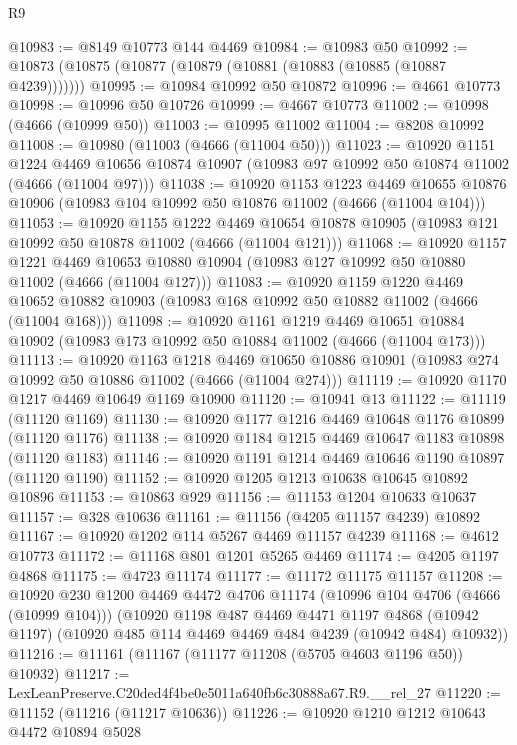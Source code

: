 \begin{lexlean}{R9}
\begin{coremodule}
@10983 := @8149 @10773 @144 @4469
@10984 := @10983 @50
@10992 := @10873 (@10875 (@10877 (@10879 (@10881 (@10883 (@10885 (@10887 @4239)))))))
@10995 := @10984 @10992 @50 @10872
@10996 := @4661 @10773
@10998 := @10996 @50 @10726
@10999 := @4667 @10773
@11002 := @10998 (@4666 (@10999 @50))
@11003 := @10995 @11002
@11004 := @8208 @10992
@11008 := @10980 (@11003 (@4666 (@11004 @50)))
@11023 := @10920
    @1151
    @1224
    @4469
    @10656
    @10874
    @10907
    (@10983 @97 @10992 @50 @10874 @11002 (@4666 (@11004 @97)))
@11038 := @10920
    @1153
    @1223
    @4469
    @10655
    @10876
    @10906
    (@10983 @104 @10992 @50 @10876 @11002 (@4666 (@11004 @104)))
@11053 := @10920
    @1155
    @1222
    @4469
    @10654
    @10878
    @10905
    (@10983 @121 @10992 @50 @10878 @11002 (@4666 (@11004 @121)))
@11068 := @10920
    @1157
    @1221
    @4469
    @10653
    @10880
    @10904
    (@10983 @127 @10992 @50 @10880 @11002 (@4666 (@11004 @127)))
@11083 := @10920
    @1159
    @1220
    @4469
    @10652
    @10882
    @10903
    (@10983 @168 @10992 @50 @10882 @11002 (@4666 (@11004 @168)))
@11098 := @10920
    @1161
    @1219
    @4469
    @10651
    @10884
    @10902
    (@10983 @173 @10992 @50 @10884 @11002 (@4666 (@11004 @173)))
@11113 := @10920
    @1163
    @1218
    @4469
    @10650
    @10886
    @10901
    (@10983 @274 @10992 @50 @10886 @11002 (@4666 (@11004 @274)))
@11119 := @10920 @1170 @1217 @4469 @10649 @1169 @10900
@11120 := @10941 @13
@11122 := @11119 (@11120 @1169)
@11130 := @10920 @1177 @1216 @4469 @10648 @1176 @10899 (@11120 @1176)
@11138 := @10920 @1184 @1215 @4469 @10647 @1183 @10898 (@11120 @1183)
@11146 := @10920 @1191 @1214 @4469 @10646 @1190 @10897 (@11120 @1190)
@11152 := @10920 @1205 @1213 @10638 @10645 @10892 @10896
@11153 := @10863 @929
@11156 := @11153 @1204 @10633 @10637
@11157 := @328 @10636
@11161 := @11156 (@4205 @11157 @4239) @10892
@11167 := @10920 @1202 @114 @5267 @4469 @11157 @4239
@11168 := @4612 @10773
@11172 := @11168 @801 @1201 @5265 @4469
@11174 := @4205 @1197 @4868
@11175 := @4723 @11174
@11177 := @11172 @11175 @11157
@11208 := @10920
    @230
    @1200
    @4469
    @4472
    @4706
    @11174
    (@10996 @104 @4706 (@4666 (@10999 @104)))
    (@10920
      @1198
      @487
      @4469
      @4471
      @1197
      @4868
      (@10942 @1197)
      (@10920 @485 @114 @4469 @4469 @484 @4239 (@10942 @484) @10932))
@11216 := @11161 (@11167 (@11177 @11208 (@5705 @4603 @1196 @50)) @10932)
@11217 := LexLeanPreserve.C20ded4f4be0e5011a640fb6c30888a67.R9.__rel_27
@11220 := @11152 (@11216 (@11217 @10636))
@11226 := @10920 @1210 @1212 @10643 @4472 @10894 @5028

\end{coremodule}
\end{lexlean}
